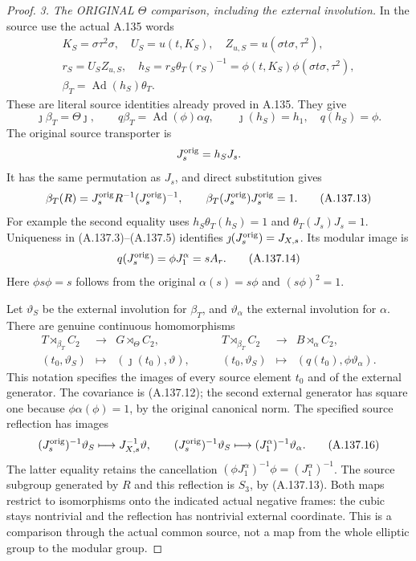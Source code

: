 \begin{proof}
\par\smallskip\noindent
\emph{3. The ORIGINAL \(\Theta\) comparison, including the
external involution.}
In the source use the actual A.135 words
\[
\begin{gathered}
 K_S=\sigma\tau^2\sigma,\quad
 U_S=u(t,K_S),\quad Z_{u,S}=u(\sigma t\sigma,\tau^2),\\
 r_S=U_SZ_{u,S},\quad
 h_S=r_S\theta_T(r_S)^{-1}
     =\phi(t,K_S)\phi(\sigma t\sigma,\tau^2),\\
 \beta_T=\operatorname{Ad}(h_S)\theta_T .
\end{gathered}
\tag{A.137.11}
\]
These are literal source identities already proved in A.135.
They give
\[
 \jmath\beta_T=\Theta\jmath,\qquad
 q\beta_T=\operatorname{Ad}(\phi)\alpha q,\qquad
 \jmath(h_S)=h_1,\quad q(h_S)=\phi .
\tag{A.137.12}
\]
The original source transporter is
\[
 J_s^{\rm orig}=h_SJ_s .
\]
It has the same permutation as \(J_s\), and direct substitution
gives
\[
 \beta_T(R)=J_s^{\rm orig}R^{-1}(J_s^{\rm orig})^{-1},
 \qquad
 \beta_T(J_s^{\rm orig})J_s^{\rm orig}=1.
\tag{A.137.13}
\]
For example the second equality uses
\(h_S\theta_T(h_S)=1\) and \(\theta_T(J_s)J_s=1\).
Uniqueness in (A.137.3)--(A.137.5) identifies
\(\jmath(J_s^{\rm orig})=J_{X,s}\).
Its modular image is
\[
 q(J_s^{\rm orig})=\phi J_1^\alpha=sA_r.
\tag{A.137.14}
\]
Here \(\phi s\phi=s\) follows from the original
\(\alpha(s)=s\phi\) and \((s\phi)^2=1\).

Let \(\vartheta_S\) be the external involution for \(\beta_T\),
and \(\vartheta_\alpha\) the external involution for \(\alpha\).
There are genuine continuous homomorphisms
\[
\begin{array}{rcl}
 T\rtimes_{\beta_T} C_2&\longrightarrow&
          G\rtimes_\Theta C_2,\\
 (t_0,\vartheta_S)&\longmapsto&
          (\jmath(t_0),\vartheta),
\end{array}
\qquad
\begin{array}{rcl}
 T\rtimes_{\beta_T} C_2&\longrightarrow&
          B\rtimes_\alpha C_2,\\
 (t_0,\vartheta_S)&\longmapsto&
          (q(t_0),\phi\vartheta_\alpha).
\end{array}
\tag{A.137.15}
\]
This notation specifies the images of every source element
\(t_0\) and of the external generator. The covariance is
(A.137.12); the second external generator has square one because
\(\phi\alpha(\phi)=1\), by the original canonical norm.
The specified source reflection has images
\[
 (J_s^{\rm orig})^{-1}\vartheta_S
 \longmapsto J_{X,s}^{-1}\vartheta,\qquad
 (J_s^{\rm orig})^{-1}\vartheta_S
 \longmapsto (J_1^\alpha)^{-1}\vartheta_\alpha .
\tag{A.137.16}
\]
The latter equality retains the cancellation
\((\phi J_1^\alpha)^{-1}\phi=(J_1^\alpha)^{-1}\).
The source subgroup generated by \(R\) and this reflection is
\(S_3\), by (A.137.13). Both maps restrict to isomorphisms onto
the indicated actual negative frames: the cubic stays nontrivial
and the reflection has nontrivial external coordinate. This is a
comparison through the actual common source, not a map from the
whole elliptic group to the modular group.


\end{proof}
